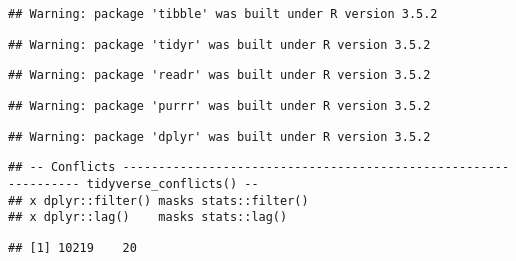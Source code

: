 \documentclass[]{article}
\newenvironment{Shaded}{\begin{snugshade}}{\end{snugshade}}
\newcommand{\KeywordTok}[1]{\textcolor[rgb]{0.13,0.29,0.53}{\textbf{#1}}}
\newcommand{\StringTok}[1]{\textcolor[rgb]{0.31,0.60,0.02}{#1}}
\newcommand{\CommentTok}[1]{\textcolor[rgb]{0.56,0.35,0.01}{\textit{#1}}}
\newcommand{\NormalTok}[1]{#1}
\begin{document}
\begin{verbatim}
## Warning: package 'tibble' was built under R version 3.5.2
\end{verbatim}

\begin{verbatim}
## Warning: package 'tidyr' was built under R version 3.5.2
\end{verbatim}

\begin{verbatim}
## Warning: package 'readr' was built under R version 3.5.2
\end{verbatim}

\begin{verbatim}
## Warning: package 'purrr' was built under R version 3.5.2
\end{verbatim}

\begin{verbatim}
## Warning: package 'dplyr' was built under R version 3.5.2
\end{verbatim}

\begin{verbatim}
## -- Conflicts ---------------------------------------------------------------- tidyverse_conflicts() --
## x dplyr::filter() masks stats::filter()
## x dplyr::lag()    masks stats::lag()
\end{verbatim}

\begin{Shaded}
\end{Shaded}

\begin{verbatim}
## [1] 10219    20
\end{verbatim}
\end{document}
